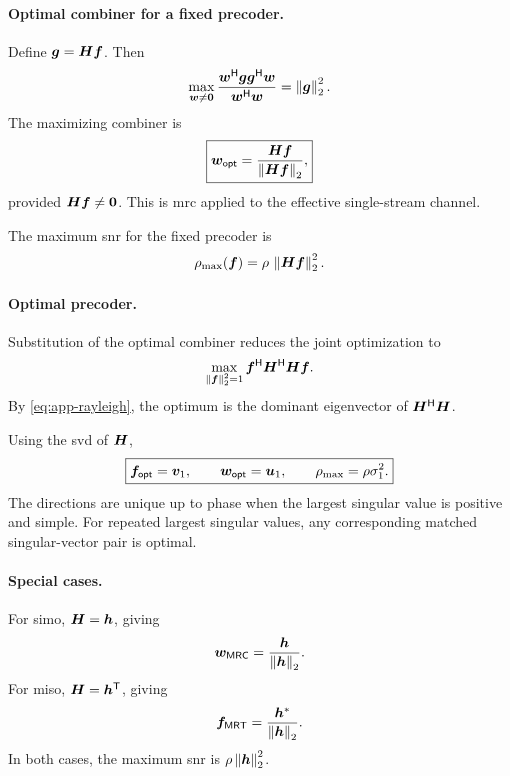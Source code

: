 \paragraph{Optimal combiner for a fixed precoder.}
Define $\bm{g}=\bm{H}\bm{f}$. Then
\begin{equation*}
	\max_{\bm{w}\neq\bm{0}}
	\frac{
		{\bm{w}}^{\mathsf{H}}\bm{g}{\bm{g}}^{\mathsf{H}}\bm{w}
	}{{\bm{w}}^{\mathsf{H}}\bm{w}}
	=\left\|\bm{g}\right\|_2^2.
\end{equation*}
The maximizing combiner is
\begin{equation}\label{eq:app-combiner}
	\boxed{
		\bm{w}_{\mathsf{opt}}
		=\frac{\bm{H}\bm{f}}{\left\|\bm{H}\bm{f}\right\|_2},
	}
\end{equation}
provided $\bm{H}\bm{f}\neq\bm{0}$.
This is \ac{mrc} applied to the effective
single-stream channel.

The maximum \ac{snr} for the fixed precoder is
\begin{equation*}
	\rho_{\max}(\bm{f})
	=\rho\,\left\|\bm{H}\bm{f}\right\|_2^2.
\end{equation*}

\paragraph{Optimal precoder.}
Substitution of the optimal combiner reduces
the joint optimization to
\begin{equation*}
	\max_{\left\|\bm{f}\right\|_2^2=1}
	{\bm{f}}^{\mathsf{H}}{\bm{H}}^{\mathsf{H}}\bm{H}\bm{f}.
\end{equation*}
By \eqref{eq:app-rayleigh}, the optimum is the
dominant eigenvector of ${\bm{H}}^{\mathsf{H}}\bm{H}$.

Using the \ac{svd} of $\bm{H}$,
\begin{equation}\label{eq:app-single-opt}
	\boxed{
		\bm{f}_{\mathsf{opt}}=\bm{v}_1,
		\qquad
		\bm{w}_{\mathsf{opt}}=\bm{u}_1,
		\qquad
		\rho_{\max}=\rho\sigma_1^2.
	}
\end{equation}
The directions are unique up to phase when the
largest singular value is positive and simple.
For repeated largest singular values, any
corresponding matched singular-vector pair is optimal.

\paragraph{Special cases.}
For \ac{simo}, $\bm{H}=\bm{h}$, giving
\begin{equation*}
	\bm{w}_{\mathsf{MRC}}
	=\frac{\bm{h}}{\left\|\bm{h}\right\|_2}.
\end{equation*}
For \ac{miso}, $\bm{H}={\bm{h}}^{\mathsf{T}}$, giving
\begin{equation*}
	\bm{f}_{\mathsf{MRT}}
	=\frac{{\bm{h}}^{*}}{\left\|\bm{h}\right\|_2}.
\end{equation*}
In both cases, the maximum \ac{snr} is
$\rho\left\|\bm{h}\right\|_2^2$.


